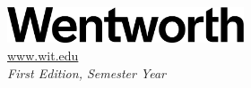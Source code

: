\thispagestyle{empty}
\vspace*{\fill}
\href{www.wit.edu}{\includegraphics[width=2.75in]{WIT-Short-Wordmark_Black.png}}\\[5ex]
\hspace*{.25in}\fontsize{15pt}{12pt}\selectfont\href{www.wit.edu}{www.wit.edu}\\[3ex]
\hspace*{.25in}\fontsize{15pt}{12pt}\selectfont \textit{First Edition, Semester Year}
\restoregeometry
